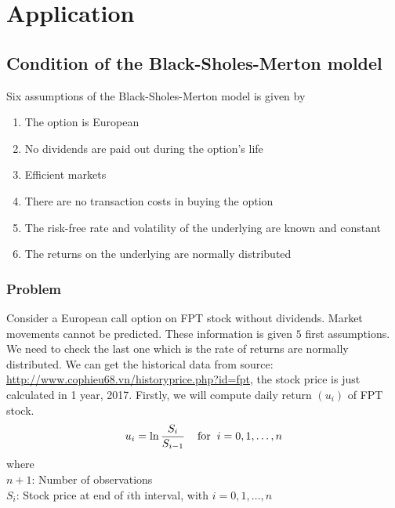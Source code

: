 \section{Application}

\subsection{Condition of the Black-Sholes-Merton moldel}
Six assumptions of the Black-Sholes-Merton model is given by
\begin{enumerate}
	\item The option is European 
	\item No dividends are paid out during the option's life
	\item Efficient markets
	\item There are no transaction costs in buying the option
	\item The risk-free rate and volatility of the underlying are known and constant
	\item The returns on the underlying are normally distributed
\end{enumerate}
\subsubsection*{Problem}
Consider a European call option on FPT stock without dividends. Market movements cannot be predicted. These information is given $5$ first assumptions. We need to check the last one which is the rate of returns are normally distributed. We can get the historical data from source: \url{http://www.cophieu68.vn/historyprice.php?id=fpt}, the stock price is just calculated in 1  year, 2017. Firstly, we will compute daily return $(u_i) $ of FPT stock. 
\begin{align*}
	u_i=\ln\dfrac{S_i}{S_{i-1}} \hspace{0.4cm} \text{for}\hspace{0.2cm}i=0, 1, \dots, n
\end{align*}
where \\
$n+1$: Number of observations\\
$S_i$: Stock price at end of $i$th interval, with $i=0, 1, \dots, n$
